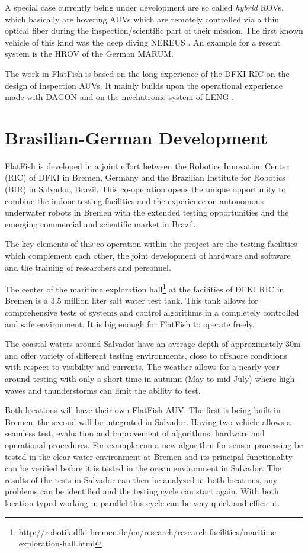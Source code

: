 \documentclass[conference]{IEEEtran}
\begin{document}
A special case currently being under development are so called \textit{hybrid} ROVs, which
basically are hovering AUVs which are remotely controlled via a thin optical fiber during
the inspection/scientific part of their mission. The first known vehicle of this kind was
the deep diving NEREUS \cite{bowen2009}. An example for a resent system is the HROV
\cite{meinecke2011} of the German MARUM.

The work in FlatFish is based on the long experience of the DFKI RIC on the design of
inspection AUVs. It mainly builds upon the operational experience made with DAGON
\cite{hildebrandt2012} and on the mechatronic system of LENG \cite{hildebrandt2013}.

\section{Brasilian-German Development}

FlatFish is developed in a joint effort between the Robotics Innovation Center (RIC) of
DFKI in Bremen, Germany and the Brazilian Institute for Robotics (BIR) in Salvador,
Brazil. This co-operation opens the unique opportunity to combine the indoor testing
facilities and the experience on autonomous underwater robots in Bremen with the 
extended testing opportunities and the emerging commercial and scientific market in Brazil.

The key elements of this co-operation within the project are the testing facilities which
complement each other, the joint development of hardware and software and the training of
researchers and personnel.

The center of the maritime exploration
hall\footnote{http://robotik.dfki-bremen.de/en/research/research-facilities/maritime-exploration-hall.html}
at the facilities of DFKI RIC in Bremen is a 3.5 million liter salt water test tank. This
tank allows for comprehensive tests of systems and control algorithms in a completely
controlled and safe environment. It is big enough for FlatFish to operate freely.

The coastal waters around Salvador have an average depth of approximately 30m and offer
variety of different testing environments, close to offshore conditions with respect to
visibility and currents. The weather  allows for a nearly year around testing with only a
short time in autumn (May to mid July) where high waves and thunderstorms can limit the
ability to test. 

Both locations will have their own FlatFish AUV. The first is being built in Bremen, the
second will be integrated in Salvador. Having two vehicle allows a seamless test,
evaluation and improvement of algorithms, hardware and operational procedures. For 
example
can a new algorithm for sensor processing be tested in the clear water environment at
Bremen and its principal functionality can be verified before it is tested in the ocean
environment in Salvador. The results of the tests in Salvador can then be analyzed at both
locations, any problems can be identified and the testing cycle can start again. With both
location typed working in parallel this cycle can be very quick and efficient.
\end{document}
